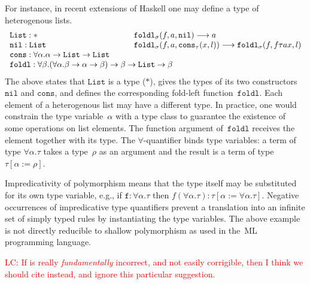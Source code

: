 \documentclass[a4paper,UKenglish,cleveref,autoref,numberwithinsect]{lipics-v2019}
\theoremstyle{definition}
\newcommand{\arrtype}{\rightarrow}
\newcommand{\subst}[2]{#1:=#2}
\newcommand{\red}{\longrightarrow}
\newcommand{\List}{\mathtt{List}}
\newcommand{\nil}{\mathtt{nil}}
\newcommand{\cons}{\mathtt{cons}}
\newcommand{\LC}[1]{\textcolor{red}{LC: #1}}
\begin{document}
For instance, in recent extensions of Haskell one may define a type of
heterogenous lists.
\[
\begin{array}{ll}
  \List : * &
  \mathtt{foldl}_\sigma(f,a,\nil) \red a \\
  \mathtt{nil} : \List &
  \mathtt{foldl}_\sigma(f,a,\cons_\tau(x,l)) \red \mathtt{foldl}_\sigma(f,f \tau a x,l) \\
  \mathtt{cons} : \forall \alpha . \alpha \arrtype \List \arrtype \List \quad\quad \\
  \multicolumn{2}{l}{\mathtt{foldl} : \forall \beta . (\forall \alpha . \beta \arrtype \alpha \arrtype \beta) \arrtype \beta \arrtype \List \arrtype \beta}
\end{array}
\]
The above states that $\List$ is a type ($*$), gives the types of its
two constructors $\nil$ and $\cons$, and defines the corresponding
fold-left function~$\mathtt{foldl}$. Each element of a heterogenous
list may have a different type. In practice, one would
  constrain the type variable~$\alpha$ %
  with a type class to
  guarantee the existence of some operations on list elements.  The
function argument of~$\mathtt{foldl}$ receives the element together
with its type. The $\forall$-quantifier binds type variables: a term
of type $\forall \alpha . \tau$ takes a type~$\rho$ as an argument and
the result is a term of type~$\tau[\subst{\alpha}{\rho}]$.

Impredicativity of polymorphism means that the type itself may be
substituted for its own type variable, e.g., if $\mathtt{f} : \forall
\alpha . \tau$ then $f (\forall \alpha . \tau) :
\tau[\subst{\alpha}{\forall\alpha.\tau}]$. Negative occurrences of
impredicative type quantifiers prevent a translation
into an infinite set of simply typed rules by instantiating the type
variables. The above example is not directly reducible to shallow
polymorphism as used in the~ML programming language.

\LC{If \cite{jou:rub:07} is really \emph{fundamentally} incorrect, and
  not easily corrigible, then I think we should cite \cite{jou:rub:99}
  instead, and ignore this particular suggestion.}
\end{document}
